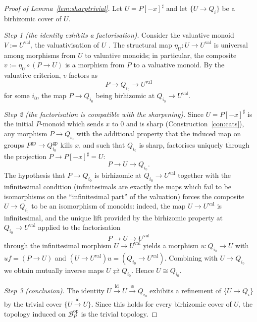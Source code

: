\documentclass[11pt]{article}
\theoremstyle{definition}
\theoremstyle{remark}
\newcommand{\Bcal}{\mathcal{B}}
\newcommand{\op}{\mathrm{op}}
\begin{document}
\begin{proof}[Proof of Lemma~\ref{lem:sharptrivial}]
Let $U = P[-x]^{\sharp}$ and let $\{U \to Q_i\}$ be a birhizomic cover of $U$.

\emph{Step 1 (the identity exhibits a factorisation).}  Consider the valuative
monoid $V := U^{\mathrm{val}}$, the valuativisation of $U$
\cite[\S 2.5]{Holmes}.  The structural map $\eta_U : U \to U^{\mathrm{val}}$
is universal among morphisms from $U$ to valuative monoids; in particular,
the composite $v := \eta_U \circ (P \to U)$ is a morphism from $P$ to a
valuative monoid.  By the valuative criterion, $v$ factors as
\[
   P \longrightarrow Q_{i_0} \longrightarrow U^{\mathrm{val}}
\]
for some $i_0$, the map $P \to Q_{i_0}$ being birhizomic at
$Q_{i_0} \to U^{\mathrm{val}}$.

\emph{Step 2 (the factorisation is compatible with the sharpening).}  Since
$U = P[-x]^{\sharp}$ is the initial $P$-monoid which sends $x$ to $0$ and is
sharp (Construction~\ref{con:cats}), any morphism $P \to Q_{i_0}$ with the
additional property that the induced map on groups $P^{\mathrm{gp}} \to
Q_{i_0}^{\mathrm{gp}}$ kills $x$, and such that $Q_{i_0}$ is sharp,
factorises uniquely through the projection $P \to P[-x]^{\sharp} = U$:
\[
   P \longrightarrow U \longrightarrow Q_{i_0}.
\]
The hypothesis that $P \to Q_{i_0}$ is birhizomic at
$Q_{i_0} \to U^{\mathrm{val}}$ together with the infinitesimal condition
(infinitesimals are exactly the maps which fail to be isomorphisms on the
``infinitesimal part'' of the valuation) forces the composite $U \to Q_{i_0}$
to be an isomorphism of monoids: indeed, the map $U \to U^{\mathrm{val}}$ is
infinitesimal, and the unique lift provided by the birhizomic property at
$Q_{i_0} \to U^{\mathrm{val}}$ applied to the factorisation
\[
   P \to U \to U^{\mathrm{val}}
\]
through the infinitesimal morphism $U \to U^{\mathrm{val}}$ yields a morphism
$u : Q_{i_0} \to U$ with $u f = (P \to U)$ and $(U \to U^{\mathrm{val}}) u =
(Q_{i_0} \to U^{\mathrm{val}})$.  Combining with $U \to Q_{i_0}$ we obtain
mutually inverse maps $U \rightleftarrows Q_{i_0}$.  Hence $U \cong Q_{i_0}$.

\emph{Step 3 (conclusion).}  The identity $U \xrightarrow{\ \mathrm{id}\ } U
\xrightarrow{\ \cong\ } Q_{i_0}$ exhibits a refinement of $\{U \to Q_i\}$ by
the trivial cover $\{U \xrightarrow{\mathrm{id}} U\}$.  Since this holds for
every birhizomic cover of $U$, the topology induced on $\Bcal_P^{\op}$ is the
trivial topology.
\end{proof}
\end{document}
